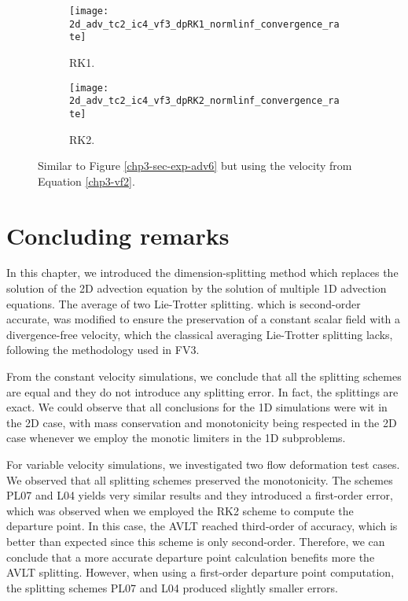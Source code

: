 \begin{figure}[!htb]
	\centering
	\begin{subfigure}{0.45\textwidth}
		\centering
		\texttt{[image: 2d\_adv\_tc2\_ic4\_vf3\_dpRK1\_normlinf\_convergence\_rate]}
		\caption{RK1.\label{chp3-sec-exp-adv8-error1}}
	\end{subfigure}
	\begin{subfigure}{0.45\textwidth}
		\centering
		\texttt{[image: 2d\_adv\_tc2\_ic4\_vf3\_dpRK2\_normlinf\_convergence\_rate]}
		\caption{RK2.\label{chp3-sec-exp-adv8-error2}}
	\end{subfigure}
	\caption{Similar to Figure \ref{chp3-sec-exp-adv6} but using the velocity from Equation   \eqref{chp3-vf2}.\label{chp3-sec-exp-adv8}}
\end{figure}

\break
\section{Concluding remarks}
In this chapter, we introduced the dimension-splitting method which replaces the solution
of the 2D advection equation by the solution of multiple 1D advection equations.
The average of two Lie-Trotter splitting. which is second-order accurate, was modified to ensure the preservation of a constant scalar field
with a divergence-free velocity, which the classical averaging Lie-Trotter splitting lacks, following
the methodology used in FV3.

From the constant velocity simulations, we conclude that all the splitting schemes are equal 
and they do not introduce any splitting error. In fact, the splittings are exact. We could observe
that all conclusions for the 1D simulations were wit in the 2D case, with mass conservation
and monotonicity  being respected in the 2D case whenever we employ the monotic limiters in the 1D subproblems.

For variable velocity simulations, we investigated two flow deformation test cases.
We observed that all splitting schemes preserved the monotonicity.
The schemes PL07 and L04 yields very similar results and they introduced a first-order error,
which was observed when we employed the RK2 scheme to compute the departure point.
In this case, the AVLT reached third-order of accuracy, which is better than expected since this scheme
is only second-order. Therefore, we can conclude that a more accurate departure point calculation
benefits more the AVLT splitting. However, when using a first-order departure point computation, the splitting schemes
PL07 and L04 produced slightly smaller errors.
